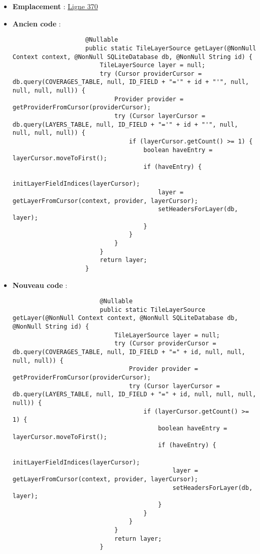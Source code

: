\begin{enumerate}
\begin{itemize}
              \item \textbf{Emplacement} :
                    \href{https://github.com/MarcusWolschon/osmeditor4android/blob/master/src/main/java/de/blau/android/resources/TileLayerDatabase.java#L370}{Ligne 370}
              \item \textbf{Ancien code} :
                    \begin{verbatim}
                    @Nullable
                    public static TileLayerSource getLayer(@NonNull Context context, @NonNull SQLiteDatabase db, @NonNull String id) {
                        TileLayerSource layer = null;
                        try (Cursor providerCursor = db.query(COVERAGES_TABLE, null, ID_FIELD + "='" + id + "'", null, null, null, null)) {
                            Provider provider = getProviderFromCursor(providerCursor);
                            try (Cursor layerCursor = db.query(LAYERS_TABLE, null, ID_FIELD + "='" + id + "'", null, null, null, null)) {
                                if (layerCursor.getCount() >= 1) {
                                    boolean haveEntry = layerCursor.moveToFirst();
                                    if (haveEntry) {
                                        initLayerFieldIndices(layerCursor);
                                        layer = getLayerFromCursor(context, provider, layerCursor);
                                        setHeadersForLayer(db, layer);
                                    }
                                }
                            }
                        }
                        return layer;
                    }
                    \end{verbatim}
              \item \textbf{Nouveau code} :
                    \begin{verbatim}
                        @Nullable
                        public static TileLayerSource getLayer(@NonNull Context context, @NonNull SQLiteDatabase db, @NonNull String id) {
                            TileLayerSource layer = null;
                            try (Cursor providerCursor = db.query(COVERAGES_TABLE, null, ID_FIELD + "=" + id, null, null, null, null)) {
                                Provider provider = getProviderFromCursor(providerCursor);
                                try (Cursor layerCursor = db.query(LAYERS_TABLE, null, ID_FIELD + "=" + id, null, null, null, null)) {
                                    if (layerCursor.getCount() >= 1) {
                                        boolean haveEntry = layerCursor.moveToFirst();
                                        if (haveEntry) {
                                            initLayerFieldIndices(layerCursor);
                                            layer = getLayerFromCursor(context, provider, layerCursor);
                                            setHeadersForLayer(db, layer);
                                        }
                                    }
                                }
                            }
                            return layer;
                        }


\end{verbatim}
\end{itemize}
\end{enumerate}
